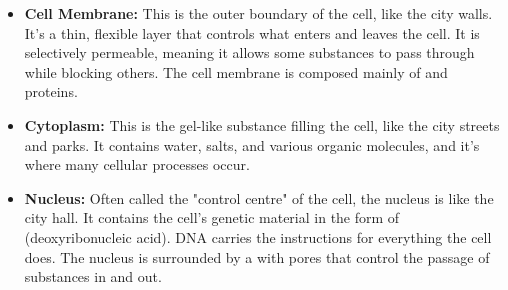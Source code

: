 \begin{itemize}
    \item \textbf{Cell Membrane:}  This is the outer boundary of the cell, like the city walls. It's a thin, flexible layer that controls what enters and leaves the cell.  It is selectively permeable, meaning it allows some substances to pass through while blocking others.  The cell membrane is composed mainly of  and proteins. 

    \item \textbf{Cytoplasm:} This is the gel-like substance filling the cell, like the city streets and parks.  It contains water, salts, and various organic molecules, and it's where many cellular processes occur.

    \item \textbf{Nucleus:}  Often called the "control centre" of the cell, the nucleus is like the city hall. It contains the cell's genetic material in the form of  (deoxyribonucleic acid). DNA carries the instructions for everything the cell does. The nucleus is surrounded by a  with pores that control the passage of substances in and out.


\end{itemize}

